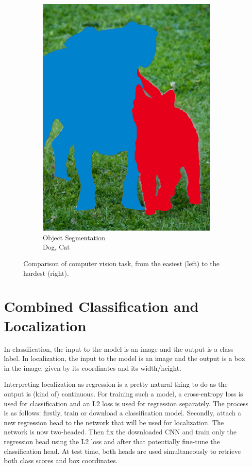 \begin{figure}
\begin{subfigure}{0.24\linewidth}
			\includegraphics[width=\linewidth]{img/compressed-dog-and-cat-segmented.png}
			\caption{Object Segmentation \\ {\color{TUDa-2b} Dog}, {\color{TUDa-9b} Cat}}
		\end{subfigure}
		\caption{Comparison of computer vision task, from the easiest (left) to the hardest (right).}
		\label{fig:computerVisionTasks}
	\end{figure}

	\section{Combined Classification and Localization}
		In classification, the input to the model is an image and the output is a class label. In localization, the input to the model is an image and the output is a box in the image, given by its coordinates and its width/height.

		Interpreting localization as regression is a pretty natural thing to do as the output is (kind of) continuous. For training such a model, a cross-entropy loss is used for classification and an L2 loss is used for regression separately. The process is as follows: firstly, train or download a classification model. Secondly, attach a new regression head to the network that will be used for localization. The network is now two-headed. Then fix the downloaded CNN and train only the regression head using the L2 loss and after that potentially fine-tune the classification head. At test time, both heads are used simultaneously to retrieve both class scores and box coordinates.

